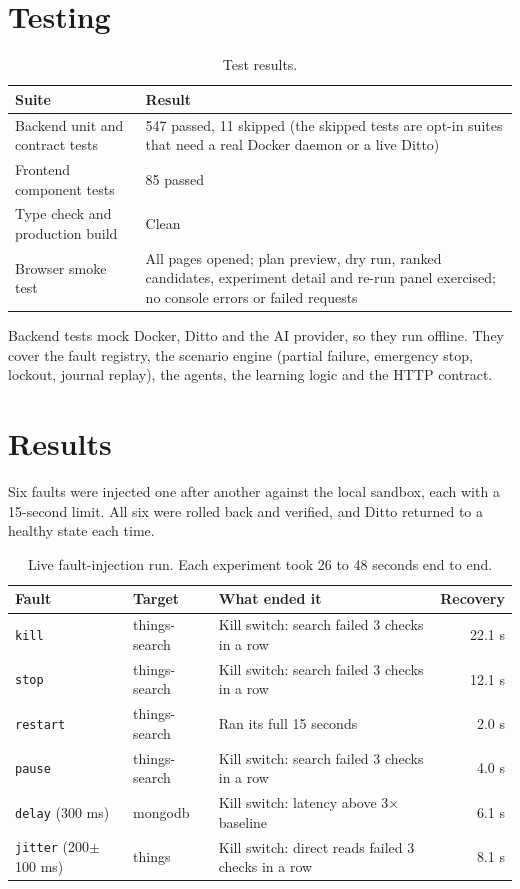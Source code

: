 \documentclass[11pt,a4paper]{article}
\begin{document}
\section{Testing}

\begin{table}[h]
\centering
\begin{tabularx}{\textwidth}{@{}lL@{}}
\toprule
\textbf{Suite} & \textbf{Result} \\
\midrule
Backend unit and contract tests & 547 passed, 11 skipped (the skipped tests are opt-in suites that need a real Docker daemon or a live Ditto) \\
Frontend component tests & 85 passed \\
Type check and production build & Clean \\
Browser smoke test & All pages opened; plan preview, dry run, ranked candidates, experiment detail and re-run panel exercised; no console errors or failed requests \\
\bottomrule
\end{tabularx}
\caption{Test results.}
\end{table}

Backend tests mock Docker, Ditto and the AI provider, so they run offline.
They cover the fault registry, the scenario engine (partial failure, emergency
stop, lockout, journal replay), the agents, the learning logic and the HTTP
contract.

\section{Results}

Six faults were injected one after another against the local sandbox, each
with a 15-second limit. All six were rolled back and verified, and Ditto
returned to a healthy state each time.

\begin{table}[h]
\centering
\begin{tabularx}{\textwidth}{@{}llLr@{}}
\toprule
\textbf{Fault} & \textbf{Target} & \textbf{What ended it} & \textbf{Recovery} \\
\midrule
\texttt{kill} & things-search & Kill switch: search failed 3 checks in a row & 22.1 s \\
\texttt{stop} & things-search & Kill switch: search failed 3 checks in a row & 12.1 s \\
\texttt{restart} & things-search & Ran its full 15 seconds & 2.0 s \\
\texttt{pause} & things-search & Kill switch: search failed 3 checks in a row & 4.0 s \\
\texttt{delay} (300 ms) & mongodb & Kill switch: latency above 3$\times$ baseline & 6.1 s \\
\texttt{jitter} (200$\pm$100 ms) & things & Kill switch: direct reads failed 3 checks in a row & 8.1 s \\
\bottomrule
\end{tabularx}
\caption{Live fault-injection run. Each experiment took 26 to 48 seconds end to end.}
\end{table}
\end{document}
